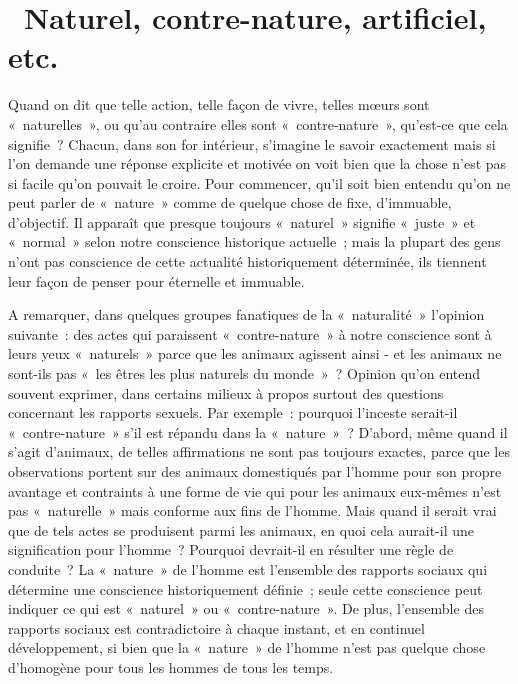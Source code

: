 \documentclass[french,twoside]{book} %
\begin{document}
\section[{ Naturel, contre-nature, artificiel, etc.}]{ Naturel, contre-nature, artificiel, etc.}
\noindent Quand on dit que telle action, telle façon de vivre, telles mœurs sont « naturelles », ou qu’au contraire elles sont « contre-nature », qu’est-ce que cela signifie ? Chacun, dans son for intérieur, s’imagine le savoir exactement mais si l’on demande une réponse explicite et motivée on voit bien que la chose n’est pas si facile qu’on pouvait le croire. Pour commencer, qu’il soit bien entendu qu’on ne peut parler de « nature » comme de quelque chose de fixe, d’immuable, d’objectif. Il apparaît que presque toujours « naturel » signifie « juste » et « normal » selon notre conscience historique actuelle ; mais la plupart des gens n’ont pas conscience de cette actualité historiquement déterminée, ils tiennent leur façon de penser pour éternelle et immuable.\par
A remarquer, dans quelques groupes fanatiques de la « naturalité » l’opinion suivante : des actes qui paraissent « contre-nature » à notre conscience sont à leurs yeux « naturels » parce que les animaux agissent ainsi - et les animaux ne sont-ils pas « les êtres les plus naturels du monde » ? Opinion qu’on entend souvent exprimer, dans certains milieux à propos surtout des questions concernant les rapports sexuels. Par exemple : pourquoi l’inceste serait-il « contre-nature » s’il est répandu dans la « nature » ? D'abord, même quand il s’agit d’animaux, de telles affirmations ne sont pas toujours exactes, parce que les observations portent sur des animaux domestiqués par l’homme pour son propre avantage et contraints à une forme de vie qui pour les animaux eux-mêmes n’est pas « naturelle » mais conforme aux fins de l’homme. Mais quand il serait vrai que de tels actes se produisent parmi les animaux, en quoi cela aurait-il une signification pour l’homme ? Pourquoi devrait-il en résulter une règle de conduite ? La « nature » de l’homme est l’ensemble des rapports sociaux qui détermine une conscience historiquement définie ; seule cette conscience peut indiquer ce qui est « naturel » ou « contre-nature ». De plus, l’ensemble des rapports sociaux est contradictoire à chaque instant, et en continuel développement, si bien que la « nature » de l’homme n’est pas quelque chose d’homogène pour tous les hommes de tous les temps.\par
\end{document}
